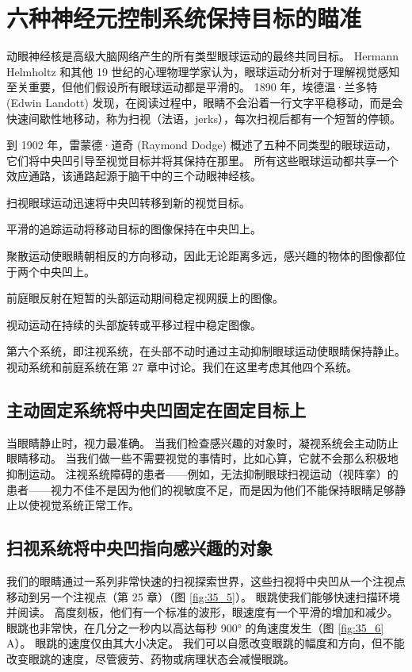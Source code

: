 \section{六种神经元控制系统保持目标的瞄准}
动眼神经核是高级大脑网络产生的所有类型眼球运动的最终共同目标。 Hermann Helmholtz 和其他 19 世纪的心理物理学家认为，眼球运动分析对于理解视觉感知至关重要，但他们假设所有眼球运动都是平滑的。 1890 年，埃德温·兰多特 (Edwin Landott) 发现，在阅读过程中，眼睛不会沿着一行文字平稳移动，而是会快速间歇性地移动，称为扫视（法语，jerks），每次扫视后都有一个短暂的停顿。

到 1902 年，雷蒙德·道奇 (Raymond Dodge) 概述了五种不同类型的眼球运动，它们将中央凹引导至视觉目标并将其保持在那里。 所有这些眼球运动都共享一个效应通路，该通路起源于脑干中的三个动眼神经核。

扫视眼球运动迅速将中央凹转移到新的视觉目标。

平滑的追踪运动将移动目标的图像保持在中央凹上。

聚散运动使眼睛朝相反的方向移动，因此无论距离多远，感兴趣的物体的图像都位于两个中央凹上。

前庭眼反射在短暂的头部运动期间稳定视网膜上的图像。

视动运动在持续的头部旋转或平移过程中稳定图像。


第六个系统，即注视系统，在头部不动时通过主动抑制眼球运动使眼睛保持静止。 视动系统和前庭系统在第 27 章中讨论。我们在这里考虑其他四个系统。

\subsection{主动固定系统将中央凹固定在固定目标上}
当眼睛静止时，视力最准确。 当我们检查感兴趣的对象时，凝视系统会主动防止眼睛移动。 当我们做一些不需要视觉的事情时，比如心算，它就不会那么积极地抑制运动。 注视系统障碍的患者——例如，无法抑制眼球扫视运动（视阵挛）的患者——视力不佳不是因为他们的视敏度不足，而是因为他们不能保持眼睛足够静止以使视觉系统正常工作。

\subsection{扫视系统将中央凹指向感兴趣的对象}

我们的眼睛通过一系列非常快速的扫视探索世界，这些扫视将中央凹从一个注视点移动到另一个注视点（第 25 章）（图 \ref{fig:35_5}）。 眼跳使我们能够快速扫描环境并阅读。 
高度刻板，他们有一个标准的波形，眼速度有一个平滑的增加和减少。 眼跳也非常快，在几分之一秒内以高达每秒 900° 的角速度发生（图 \ref{fig:35_6} A）。 
眼跳的速度仅由其大小决定。 我们可以自愿改变眼跳的幅度和方向，但不能改变眼跳的速度，尽管疲劳、药物或病理状态会减慢眼跳。

